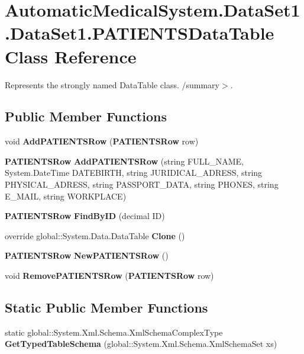 \section{AutomaticMedicalSystem.DataSet1.DataSet1.PATIENTSDataTable Class Reference}
\label{class_automatic_medical_system_1_1_data_set1_1_1_p_a_t_i_e_n_t_s_data_table}
Represents the strongly named DataTable class. /summary$>$.  


\subsection*{Public Member Functions}
\begin{CompactItemize}
\item 
void \textbf{AddPATIENTSRow} ({\bf PATIENTSRow} row)\label{class_automatic_medical_system_1_1_data_set1_1_1_p_a_t_i_e_n_t_s_data_table_bc69b75933cb6e3c6ed38f5c08f87a6c}

\item 
{\bf PATIENTSRow} \textbf{AddPATIENTSRow} (string FULL\_\-NAME, System.DateTime DATEBIRTH, string JURIDICAL\_\-ADRESS, string PHYSICAL\_\-ADRESS, string PASSPORT\_\-DATA, string PHONES, string E\_\-MAIL, string WORKPLACE)\label{class_automatic_medical_system_1_1_data_set1_1_1_p_a_t_i_e_n_t_s_data_table_a2e017e86b2cf3bb677c9df29e973506}

\item 
{\bf PATIENTSRow} \textbf{FindByID} (decimal ID)\label{class_automatic_medical_system_1_1_data_set1_1_1_p_a_t_i_e_n_t_s_data_table_bee7bff6761973141a38420669fce29b}

\item 
override global::System.Data.DataTable \textbf{Clone} ()\label{class_automatic_medical_system_1_1_data_set1_1_1_p_a_t_i_e_n_t_s_data_table_04986f3038a33b6ba160bcc2f49bbcb2}

\item 
{\bf PATIENTSRow} \textbf{NewPATIENTSRow} ()\label{class_automatic_medical_system_1_1_data_set1_1_1_p_a_t_i_e_n_t_s_data_table_1cdf1bad8af1a2909ea52108697c48bb}

\item 
void \textbf{RemovePATIENTSRow} ({\bf PATIENTSRow} row)\label{class_automatic_medical_system_1_1_data_set1_1_1_p_a_t_i_e_n_t_s_data_table_04acc2e7db702d5e8e5cf9dcd438bc5a}

\end{CompactItemize}
\subsection*{Static Public Member Functions}
\begin{CompactItemize}
\item 
static global::System.Xml.Schema.XmlSchemaComplexType \textbf{GetTypedTableSchema} (global::System.Xml.Schema.XmlSchemaSet xs)\label{class_automatic_medical_system_1_1_data_set1_1_1_p_a_t_i_e_n_t_s_data_table_a152fc125944ec8ed219cfd8b5cd6907}

\end{CompactItemize}
